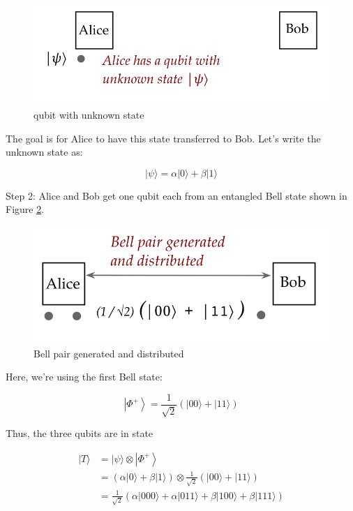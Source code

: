 \documentclass[main.tex]{subfiles}
\begin{document}
    \begin{figure}
        \centering
        \includegraphics[width=5in]{notes/figs/n07/28teleport1.png}
        \caption{qubit with unknown state}
        \label{fig:28teleport1}
    \end{figure}
    
    The goal is for Alice to have this state transferred to Bob. Let's write the unknown state as:
    
    $$
    |\psi\rangle=\alpha|0\rangle+\beta|1\rangle
    $$
    
    Step 2: Alice and Bob get one qubit each from an entangled Bell state shown in Figure \ref{fig:29teleport2}.
    
    \begin{figure}
        \centering
        \includegraphics[width=5in]{notes/figs/n07/29teleport2.png}
        \caption{Bell pair generated and distributed}
        \label{fig:29teleport2}
    \end{figure}
    
    Here, we're using the first Bell state:
    
    $$
    \left|\Phi^{+}\right\rangle=\frac{1}{\sqrt{2}}(|00\rangle+|11\rangle)
    $$
    
    Thus, the three qubits are in state
    
    $$
    \begin{aligned}
    |T\rangle &=|\psi\rangle \otimes\left|\Phi^{+}\right\rangle \\
    &=(\alpha|0\rangle+\beta|1\rangle) \otimes \frac{1}{\sqrt{2}}(|00\rangle+|11\rangle) \\
    &=\frac{1}{\sqrt{2}}(\alpha|000\rangle+\alpha|011\rangle+\beta|100\rangle+\beta|111\rangle)
    \end{aligned}
    $$
    
\end{document}
